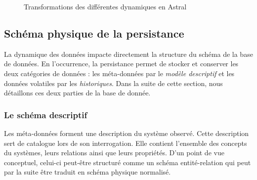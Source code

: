 \begin{figure}[ht]
    \centering
{}
\caption{Transformations des différentes dynamiques en Astral}\label{fig:contrib:asteroid:theorie:dynamics}
\end{figure}

\subsection{Schéma physique de la persistance}\label{sec:contrib:asteroid:theorie:schema}
La dynamique des données impacte directement la structure du schéma de la base de données. En l'occurrence, la persistance permet de stocker et conserver les deux catégories de données : les méta-données par le \textit{modèle descriptif} et les données volatiles par les \textit{historiques}. Dans la suite de cette section, nous détaillons ces deux parties de la base de donnée.

\subsubsection{Le schéma descriptif}
Les méta-données forment une description du système observé. Cette description sert de catalogue lors de son interrogation. Elle contient l'ensemble des concepts du systèmes, leurs relations ainsi que leurs propriétés. D'un point de vue conceptuel, celui-ci peut-être structuré comme un schéma entité-relation qui peut par la suite être traduit en schéma physique normalisé.

